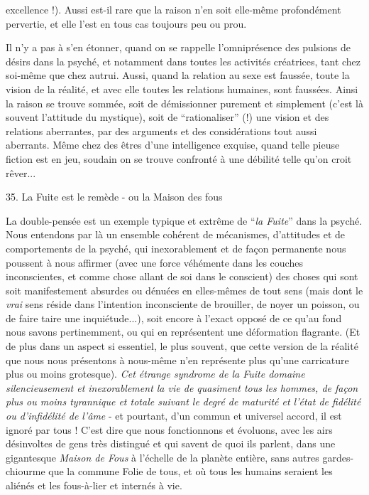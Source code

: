 
excellence !). Aussi est-il rare que la raison n'en soit elle-même profondément pervertie, et elle l'est en tous cas toujours peu ou prou.

Il n'y a pas à s'en étonner, quand on se rappelle l'omniprésence des pulsions de désirs dans la psyché, et notamment dans toutes les activités créatrices, tant chez soi-même que chez autrui. Aussi, quand la relation au sexe est faussée, toute la vision de la réalité, et avec elle toutes les relations humaines, sont faussées. Ainsi la raison se trouve sommée, soit de démissionner purement et simplement (c'est là souvent l'attitude du mystique), soit de ``rationaliser'' (!) une vision et des relations aberrantes, par des arguments et des considérations tout aussi aberrants. Même chez des êtres d'une intelligence exquise, quand telle pieuse fiction est en jeu, soudain on se trouve confronté à une débilité telle qu'on croit rêver...

35. La Fuite est le remède - ou la Maison des fous

La double-pensée est un exemple typique et extrême de ``\textit{la Fuite}'' dans la psyché. Nous entendons par là un ensemble cohérent de mécanismes, d'attitudes et de comportements de la psyché, qui inexorablement et de façon permanente nous poussent à nous affirmer (avec une force véhémente dans les couches inconscientes, et comme chose allant de soi dans le conscient) des choses qui sont soit manifestement absurdes ou dénuées en elles-mêmes de tout sens (mais dont le \textit{vrai} sens réside dans l'intention inconsciente de brouiller, de noyer un poisson, ou de faire taire une inquiétude...), soit encore à l'exact opposé de ce qu'au fond nous savons pertinemment, ou qui en représentent une déformation flagrante. (Et de plus dans un aspect si essentiel, le plus souvent, que cette version de la réalité que nous nous présentons à nous-même n'en représente plus qu'une carricature plus ou moins grotesque). \textit{Cet étrange syndrome de la Fuite domaine silencieusement et inexorablement la vie de quasiment tous les hommes, de façon plus ou moins tyrannique et totale suivant le degré de maturité et l'état de fidélité ou d'infidélité de l'âme} - et pourtant, d'un commun et universel accord, il est ignoré par tous ! C'est dire que nous fonctionnons et évoluons, avec les airs désinvoltes de gens très distingué et qui savent de quoi ils parlent, dans une gigantesque \textit{Maison de Fous} à l'échelle de la planète entière, sans autres gardes-chiourme que la commune Folie de tous, et où tous les humains seraient les aliénés et les fous-à-lier et internés à vie.

